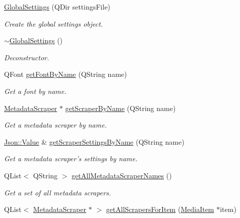 \begin{DoxyCompactItemize}
\item 
\hyperlink{class_a_w_e_1_1_global_settings_ae01ec075682268ed958414502fcb90a5}{Global\-Settings} (Q\-Dir settings\-File)
\begin{DoxyCompactList}\small\item\em Create the global settings object. \end{DoxyCompactList}\item 
\hyperlink{class_a_w_e_1_1_global_settings_ad3e8fa5120473c6c0151573ad81e1b04}{$\sim$\-Global\-Settings} ()
\begin{DoxyCompactList}\small\item\em Deconstructor. \end{DoxyCompactList}\item 
Q\-Font \hyperlink{class_a_w_e_1_1_global_settings_a63104e9ff0df7cfd5e82fc82a322f92c}{get\-Font\-By\-Name} (Q\-String name)
\begin{DoxyCompactList}\small\item\em Get a font by name. \end{DoxyCompactList}\item 
\hyperlink{class_a_w_e_1_1_metadata_scraper}{Metadata\-Scraper} $\ast$ \hyperlink{class_a_w_e_1_1_global_settings_a26cafca46ab8e2e8633c93f0411fc5c8}{get\-Scraper\-By\-Name} (Q\-String name)
\begin{DoxyCompactList}\small\item\em Get a metadata scraper by name. \end{DoxyCompactList}\item 
\hyperlink{class_json_1_1_value}{Json\-::\-Value} \& \hyperlink{class_a_w_e_1_1_global_settings_a70e68985d23795c9e6222dfc433df203}{get\-Scraper\-Settings\-By\-Name} (Q\-String name)
\begin{DoxyCompactList}\small\item\em Get a metadata scraper's settings by name. \end{DoxyCompactList}\item 
Q\-List$<$ Q\-String $>$ \hyperlink{class_a_w_e_1_1_global_settings_ae044264a5db5e73314dbe8b261f23644}{get\-All\-Metadata\-Scraper\-Names} ()
\begin{DoxyCompactList}\small\item\em Get a set of all metadata scrapers. \end{DoxyCompactList}\item 
Q\-List$<$ \hyperlink{class_a_w_e_1_1_metadata_scraper}{Metadata\-Scraper} $\ast$ $>$ \hyperlink{class_a_w_e_1_1_global_settings_aa4cda6b91613e5f327eee299f34cccea}{get\-All\-Scrapers\-For\-Item} (\hyperlink{class_a_w_e_1_1_media_item}{Media\-Item} $\ast$item)

\end{DoxyCompactItemize}
